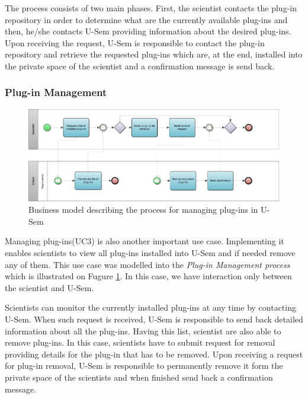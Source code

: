 The process consists of two main phases. First, the scientist contacts the plug-in repository in order to determine what are the currently available plug-ins and then, he/she contacts U-Sem providing information about the desired plug-ins. Upon receiving the request, U-Sem is responsible to contact the plug-in repository and retrieve the requested plug-ins which are, at the end, installed into the private space of the scientist and a confirmation message is send back.

\subsubsection{Plug-in Management}

\begin{figure}[h!]
  \centering
  	\includegraphics[scale=0.7,angle=90]{plug-in/business_processes/PluginManagementBusinessModel.jpg}
  \caption{Business model describing the process for managing plug-ins in U-Sem}
  \label{fig_admin_bpm}
\end{figure}

Managing plug-ins(UC3) is also another important use case. Implementing it enables scientists to view all plug-ins installed into U-Sem and if needed remove any of them. This use case was modelled into the \textit{Plug-in Management process} which is illustrated on Fugure \ref{fig_admin_bpm}. In this case, we have interaction only between the scientist and U-Sem.

Scientists can monitor the currently installed plug-ins at any time by contacting U-Sem. When such request is received, U-Sem is responsible to send back detailed information about all the plug-ins. Having this list, scientist are also able to remove plug-ins. In this case, scientists have to submit request for removal providing details for the plug-in that has to be removed. Upon receiving a request for plug-in removal, U-Sem is responsible to permanently remove it form the private space of the scientists and when finished send back a confirmation message.


